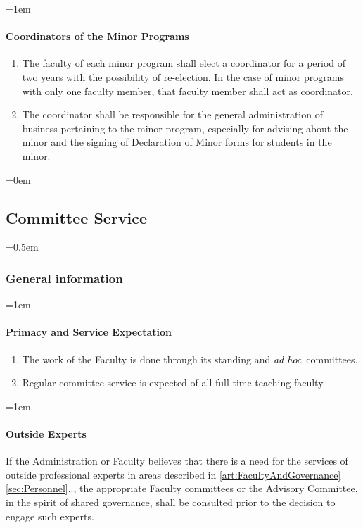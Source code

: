 \documentclass{manual}
\newcommand{\keyword}[1]{\textcolor{black}{#1}}
\newcommand{\adho}{\keyword{\textit{ad hoc}}~}
\let\oldsubsection\subsection
\renewcommand\subsection{\leftskip=0em\oldsubsection}
\let\oldsubsubsection\subsubsection
\renewcommand\subsubsection{\leftskip=0.5em\oldsubsubsection}
\let\oldparagraph\paragraph
\renewcommand\paragraph{\leftskip=1em\oldparagraph}
\newcommand{\itemLevelA}{\alph*.}
\newcommand{\itemRefA}{\alph*}
\begin{document}
\paragraph{Coordinators of the Minor Programs}
\begin{enumerate}[label=\itemLevelA,ref=\itemRefA]
\item The faculty of each minor program shall elect a coordinator for a period of two years with the possibility of re-election. In the case of minor programs with only one faculty member, that faculty member shall act as coordinator.
\item The coordinator shall be responsible for the general administration of business pertaining to the minor program, especially for advising about the minor and the signing of Declaration of Minor forms for students in the minor.
\end{enumerate}

\subsection{Committee Service}\label{sec:CommitteeService}
\subsubsection{General information}\label{sub:GeneralInformation}

\paragraph{Primacy and Service Expectation}

\begin{enumerate}[label=\itemLevelA,ref=\itemRefA]
\item The work of the Faculty is done through its standing and \adho committees.

\item Regular committee service is expected of all full-time teaching faculty.
\end{enumerate}

\paragraph{Outside Experts}
If the Administration or Faculty believes that there is a need for the services of outside professional experts in areas described in \cref{art:FacultyAndGovernance} \cref{sec:Personnel}.., the appropriate Faculty committees or the Advisory Committee, in the spirit of shared governance, shall be consulted prior to the decision to engage such experts.
\end{document}

